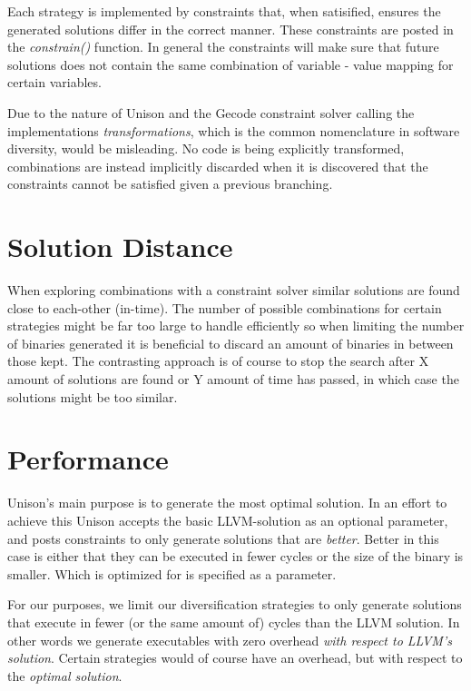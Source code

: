 Each strategy is implemented by constraints that, when satisified, ensures the
generated solutions differ in the correct manner. These constraints are posted in the
\textit{constrain()} function. In general the constraints will make sure that future
solutions does not contain the same combination of variable - value mapping for certain
variables.

Due to the nature of Unison and the Gecode constraint solver calling the implementations
\textit{transformations}, which is the common nomenclature in software diversity, would be
misleading. No code is being explicitly transformed, combinations are instead implicitly
discarded when it is discovered that the constraints cannot be satisfied given a previous
branching.



\section{Solution Distance}
When exploring combinations with a constraint solver similar solutions are found close to
each-other (in-time).  The number of possible combinations for certain strategies might be
far too large to handle efficiently so when limiting the number of binaries generated it is
beneficial to discard an amount of binaries in between those kept. The contrasting approach
is of course to stop the search after X amount of solutions are found or Y amount of time
has passed, in which case the solutions might be too similar.

\section{Performance}

Unison's main purpose is to generate the most optimal solution. In an effort to achieve
this Unison accepts the basic LLVM-solution as an optional parameter, and posts constraints
to only generate solutions that are \textit{better}. Better in this case is either that
they can be executed in fewer cycles or the size of the binary is smaller. Which is optimized
for is specified as a parameter.

For our purposes, we limit our diversification strategies to only generate solutions
that execute in fewer (or the same amount of) cycles than the LLVM solution. In other words
we generate executables with zero overhead \textit{with respect to LLVM's solution}.
Certain strategies would of course have an overhead, but with respect to the \textit{optimal
solution}.

